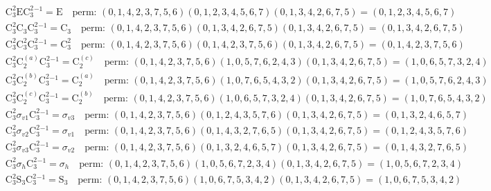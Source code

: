 \begin{align*}
& \mathrm{C}_{3}^{2} \mathrm{E} \mathrm{C}_{3}^{2}^{-1} = \mathrm{E} \quad \text{perm: }(0, 1, 4, 2, 3, 7, 5, 6)(0, 1, 2, 3, 4, 5, 6, 7)(0, 1, 3, 4, 2, 6, 7, 5) = (0, 1, 2, 3, 4, 5, 6, 7) \\
& \mathrm{C}_{3}^{2} \mathrm{C}_{3} \mathrm{C}_{3}^{2}^{-1} = \mathrm{C}_{3} \quad \text{perm: }(0, 1, 4, 2, 3, 7, 5, 6)(0, 1, 3, 4, 2, 6, 7, 5)(0, 1, 3, 4, 2, 6, 7, 5) = (0, 1, 3, 4, 2, 6, 7, 5) \\
& \mathrm{C}_{3}^{2} \mathrm{C}_{3}^{2} \mathrm{C}_{3}^{2}^{-1} = \mathrm{C}_{3}^{2} \quad \text{perm: }(0, 1, 4, 2, 3, 7, 5, 6)(0, 1, 4, 2, 3, 7, 5, 6)(0, 1, 3, 4, 2, 6, 7, 5) = (0, 1, 4, 2, 3, 7, 5, 6) \\
& \mathrm{C}_{3}^{2} \mathrm{C}_{2}^{(a)} \mathrm{C}_{3}^{2}^{-1} = \mathrm{C}_{2}^{(c)} \quad \text{perm: }(0, 1, 4, 2, 3, 7, 5, 6)(1, 0, 5, 7, 6, 2, 4, 3)(0, 1, 3, 4, 2, 6, 7, 5) = (1, 0, 6, 5, 7, 3, 2, 4) \\
& \mathrm{C}_{3}^{2} \mathrm{C}_{2}^{(b)} \mathrm{C}_{3}^{2}^{-1} = \mathrm{C}_{2}^{(a)} \quad \text{perm: }(0, 1, 4, 2, 3, 7, 5, 6)(1, 0, 7, 6, 5, 4, 3, 2)(0, 1, 3, 4, 2, 6, 7, 5) = (1, 0, 5, 7, 6, 2, 4, 3) \\
& \mathrm{C}_{3}^{2} \mathrm{C}_{2}^{(c)} \mathrm{C}_{3}^{2}^{-1} = \mathrm{C}_{2}^{(b)} \quad \text{perm: }(0, 1, 4, 2, 3, 7, 5, 6)(1, 0, 6, 5, 7, 3, 2, 4)(0, 1, 3, 4, 2, 6, 7, 5) = (1, 0, 7, 6, 5, 4, 3, 2) \\
& \mathrm{C}_{3}^{2} \sigma_{v1} \mathrm{C}_{3}^{2}^{-1} = \sigma_{v3} \quad \text{perm: }(0, 1, 4, 2, 3, 7, 5, 6)(0, 1, 2, 4, 3, 5, 7, 6)(0, 1, 3, 4, 2, 6, 7, 5) = (0, 1, 3, 2, 4, 6, 5, 7) \\
& \mathrm{C}_{3}^{2} \sigma_{v2} \mathrm{C}_{3}^{2}^{-1} = \sigma_{v1} \quad \text{perm: }(0, 1, 4, 2, 3, 7, 5, 6)(0, 1, 4, 3, 2, 7, 6, 5)(0, 1, 3, 4, 2, 6, 7, 5) = (0, 1, 2, 4, 3, 5, 7, 6) \\
& \mathrm{C}_{3}^{2} \sigma_{v3} \mathrm{C}_{3}^{2}^{-1} = \sigma_{v2} \quad \text{perm: }(0, 1, 4, 2, 3, 7, 5, 6)(0, 1, 3, 2, 4, 6, 5, 7)(0, 1, 3, 4, 2, 6, 7, 5) = (0, 1, 4, 3, 2, 7, 6, 5) \\
& \mathrm{C}_{3}^{2} \sigma_{h} \mathrm{C}_{3}^{2}^{-1} = \sigma_{h} \quad \text{perm: }(0, 1, 4, 2, 3, 7, 5, 6)(1, 0, 5, 6, 7, 2, 3, 4)(0, 1, 3, 4, 2, 6, 7, 5) = (1, 0, 5, 6, 7, 2, 3, 4) \\
& \mathrm{C}_{3}^{2} \mathrm{S}_{3} \mathrm{C}_{3}^{2}^{-1} = \mathrm{S}_{3} \quad \text{perm: }(0, 1, 4, 2, 3, 7, 5, 6)(1, 0, 6, 7, 5, 3, 4, 2)(0, 1, 3, 4, 2, 6, 7, 5) = (1, 0, 6, 7, 5, 3, 4, 2) \\

\end{align*}
